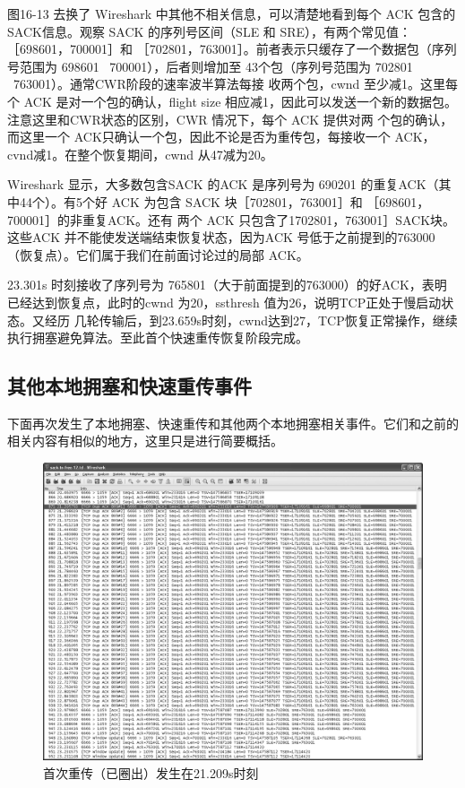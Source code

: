 图16-13 去换了 Wireshark 中其他不相关信息，可以清楚地看到每个 ACK 包含的SACK信息。观察 SACK 的序列号区间（SLE 和 SRE），有两个常见值：［698601，700001］和
［702801，763001］。前者表示只缓存了一个数据包（序列号范围为 698601 ~700001），后者则增加至 43个包（序列号范围为 702801 ~763001）。通常CWR阶段的速率波半算法每接
收两个包，cwnd 至少减1。这里每个 ACK 是对一个包的确认，flight size 相应减1，因此可以发送一个新的数据包。注意这里和CWR状态的区别，CWR 情况下，每个 ACK 提供对两
个包的确认，而这里一个 ACK只确认一个包，因此不论是否为重传包，每接收一个 ACK，cvnd减1。在整个恢复期间，cwnd 从47减为20。

Wireshark 显示，大多数包含SACK 的ACK 是序列号为 690201 的重复ACK（其中44个）。有5个好 ACK 为包含 SACK 块［702801，763001］和 ［698601，700001］的非重复ACK。还有
两个 ACK 只包含了1702801，763001］SACK块。这些ACK 并不能使发送端结束恢复状态，因为ACK 号低于之前提到的763000（恢复点）。它们属于我们在前面讨论过的局部 ACK。

23.301s 时刻接收了序列号为 765801（大于前面提到的763000）的好ACK，表明已经达到恢复点，此时的cwnd 为20，ssthresh 值为26，说明TCP正处于慢启动状态。又经历
几轮传输后，到23.659s时刻，cwnd达到27，TCP恢复正常操作，继续执行拥塞避免算法。至此首个快速重传恢复阶段完成。

\subsection{其他本地拥塞和快速重传事件}
下面再次发生了本地拥塞、快速重传和其他两个本地拥塞相关事件。它们和之前的相关内容有相似的地方，这里只是进行简要概括。
\begin{figure}[!htb]
    \centering
	\includegraphics[width=1\textwidth]{imgs/16/16-13.png}
	\caption{首次重传（已圈出）发生在21.209s时刻}
\end{figure}
